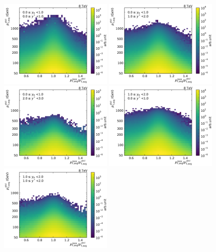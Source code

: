 \begin{figure}[htbp]
    \centering
    \includegraphics[width=0.49\textwidth]{figures/measurement/gen_vs_reco_vs_gen_ptavg_yb0ys0.pdf}\hfill
    \includegraphics[width=0.49\textwidth]{figures/measurement/gen_vs_reco_vs_gen_ptavg_yb0ys1.pdf}
    \includegraphics[width=0.49\textwidth]{figures/measurement/gen_vs_reco_vs_gen_ptavg_yb0ys2.pdf}\hfill
    \includegraphics[width=0.49\textwidth]{figures/measurement/gen_vs_reco_vs_gen_ptavg_yb1ys0.pdf}
    \includegraphics[width=0.49\textwidth]{figures/measurement/gen_vs_reco_vs_gen_ptavg_yb1ys1.pdf}\hfill

\end{figure}
